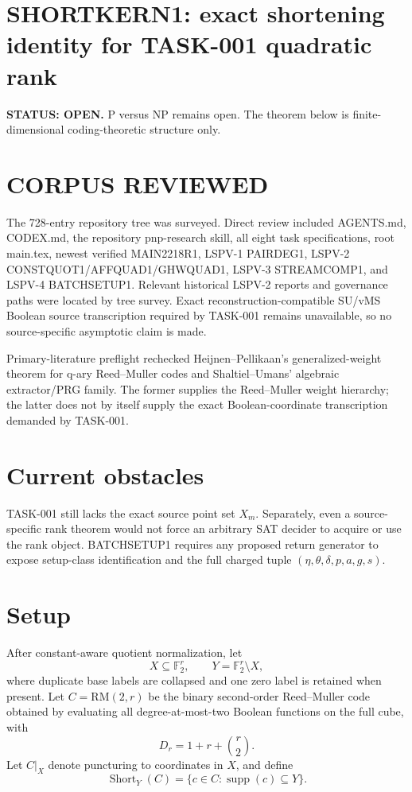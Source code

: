 \documentclass[11pt]{article}
\begin{document}
\section*{SHORTKERN1: exact shortening identity for TASK-001 quadratic rank}
\textbf{STATUS: OPEN.} P versus NP remains open. The theorem below is finite-dimensional coding-theoretic structure only.

\section*{CORPUS REVIEWED}
The 728-entry repository tree was surveyed. Direct review included AGENTS.md, CODEX.md, the repository pnp-research skill, all eight task specifications, root main.tex, newest verified MAIN2218R1, LSPV-1 PAIRDEG1, LSPV-2 CONSTQUOT1/AFFQUAD1/GHWQUAD1, LSPV-3 STREAMCOMP1, and LSPV-4 BATCHSETUP1. Relevant historical LSPV-2 reports and governance paths were located by tree survey. Exact reconstruction-compatible SU/vMS Boolean source transcription required by TASK-001 remains unavailable, so no source-specific asymptotic claim is made.

Primary-literature preflight rechecked Heijnen--Pellikaan's generalized-weight theorem for q-ary Reed--Muller codes and Shaltiel--Umans' algebraic extractor/PRG family. The former supplies the Reed--Muller weight hierarchy; the latter does not by itself supply the exact Boolean-coordinate transcription demanded by TASK-001.

\section*{Current obstacles}
TASK-001 still lacks the exact source point set \(X_m\). Separately, even a source-specific rank theorem would not force an arbitrary SAT decider to acquire or use the rank object. BATCHSETUP1 requires any proposed return generator to expose setup-class identification and the full charged tuple \((\eta,\theta,\delta,p,a,g,s)\).

\section*{Setup}
After constant-aware quotient normalization, let
\[
X\subseteq\mathbb F_2^r,\qquad Y=\mathbb F_2^r\setminus X,
\]
where duplicate base labels are collapsed and one zero label is retained when present. Let \(C=\mathrm{RM}(2,r)\) be the binary second-order Reed--Muller code obtained by evaluating all degree-at-most-two Boolean functions on the full cube, with
\[
D_r=1+r+\binom r2.
\]
Let \(C|_X\) denote puncturing to coordinates in \(X\), and define
\[
\operatorname{Short}_Y(C)=\{c\in C:\operatorname{supp}(c)\subseteq Y\}.
\]
\end{document}
